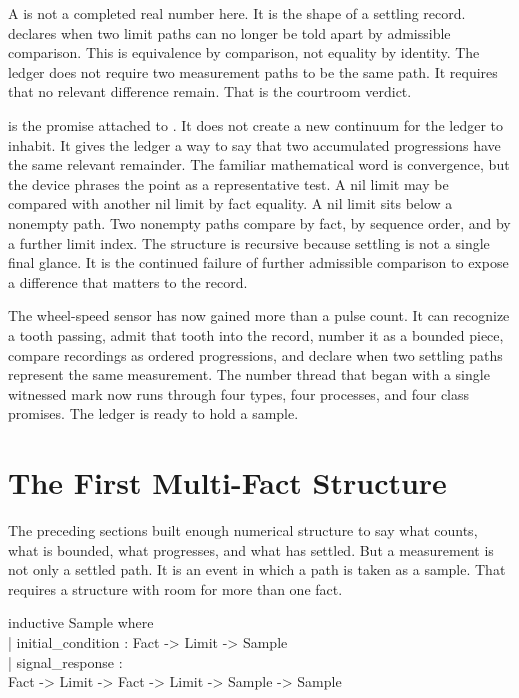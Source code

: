 A  is not a completed real number here. It is the shape of a
settling record.  declares when two limit paths can no
longer be told apart by admissible comparison. This is equivalence by
comparison, not equality by identity. The ledger does not require two
measurement paths to be the same path. It requires that no relevant difference
remain. That is the courtroom verdict.

 is the promise attached to . It does not create a
new continuum for the ledger to inhabit. It gives the ledger a way to say that
two accumulated progressions have the same relevant remainder. The familiar
mathematical word is convergence, but the device phrases the point as a
representative test. A nil limit may be compared with another nil limit by
fact equality. A nil limit sits below a nonempty path. Two nonempty paths
compare by fact, by sequence order, and by a further limit index. The structure
is recursive because settling is not a single final glance. It is the
continued failure of further admissible comparison to expose a difference that
matters to the record.

The wheel-speed sensor has now gained more than a pulse count. It can recognize
a tooth passing, admit that tooth into the record, number it as a bounded
piece, compare recordings as ordered progressions, and declare when two
settling paths represent the same measurement. The number thread that began
with a single witnessed mark now runs through four types, four processes, and
four class promises. The ledger is ready to hold a sample.

\section{The First Multi-Fact Structure}
\label{se:first-multi-fact}

The preceding sections built enough numerical structure to say what counts,
what is bounded, what progresses, and what has settled. But a measurement is
not only a settled path. It is an event in which a path is taken as a sample.
That requires a structure with room for more than one fact.

\begin{leancode}
inductive Sample where\\
\quad | initial\_condition : Fact -> Limit -> Sample\\
\quad | signal\_response :\\
\quad\quad Fact -> Limit -> Fact -> Limit -> Sample -> Sample
\end{leancode}

